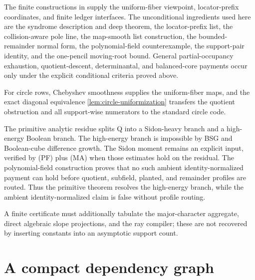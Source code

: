 \documentclass[12pt,a4paper]{amsart}
\numberwithin{equation}{section}
\theoremstyle{remark}
\begin{document}
The finite constructions in \cite{Cho26CapV13,Cho26Grande} supply the
uniform-fiber viewpoint, locator-prefix coordinates, and finite ledger
interfaces.  The unconditional ingredients used here are the syndrome
description and deep theorem, the locator-prefix list, the collision-aware
pole line, the map-smooth list construction, the bounded-remainder normal
form, the polynomial-field counterexample, the support-pair identity, and
the one-pencil moving-root bound.  General partial-occupancy exhaustion,
quotient-descent, determinantal, and balanced-core payments occur only under the
explicit conditional criteria proved above.

For circle rows, Chebyshev smoothness supplies the uniform-fiber maps, and
the exact diagonal equivalence \cref{lem:circle-uniformization} transfers
the quotient obstruction and all support-wise numerators to the standard
circle code.

The primitive analytic residue splits Q into a Sidon-heavy branch and a
high-energy Boolean branch.  The high-energy branch is impossible by BSG
and Boolean-cube difference growth.  The Sidon moment remains an explicit
input, verified
by \textup{(PF)} plus \textup{(MA)} when those estimates hold on the
residual.  The polynomial-field construction proves that no such ambient
identity-normalized payment can hold before quotient, subfield, planted,
and remainder profiles are routed.  Thus the primitive theorem resolves
the high-energy branch, while the ambient identity-normalized claim is
false without profile routing.

A finite certificate must additionally tabulate the major-character
aggregate, direct algebraic slope projections, and the ray compiler; these
are not recovered by inserting constants into an asymptotic support count.

\section{A compact dependency graph}\label{sec:dependency-graph}
\end{document}
